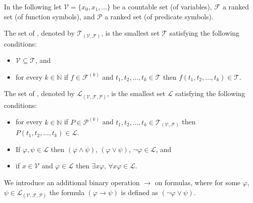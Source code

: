 In the following let $\mathcal{V}=\{x_0,x_1,\dots\}$ be a countable set (of variables), $\mathcal{F}$ a ranked set (of function symbols), and $\mathcal{P}$ a ranked set (of predicate symbols).
\begin{definition}
	The set of , denoted by $\mathcal{T}_{(\mathcal{V},\mathcal{F})}$, is the smallest set $\mathcal{T}$ satisfying the following conditions:
	\begin{itemize}
		\item $\mathcal{V} \subseteq \mathcal{T}$, and
		\item for every $k\in\mathbb{N}$ if $f\in\mathcal{F}^{(k)}$ and $t_1,t_2,\dots,t_k\in\mathcal{T}$ then $f(t_1,t_2,\dots,t_k)\in\mathcal{T}$.
	\end{itemize}
	The set of , denoted by $\mathcal{L}_{(\mathcal{V},\mathcal{F},\mathcal{P})}$, is the smallest set $\mathcal{L}$ satisfying the following conditions:
	\begin{itemize}
		\item for every $k\in\mathbb{N}$ if $P\in\mathcal{P}^{(k)}$ and $t_1,t_2,\dots,t_k\in\mathcal{T}_{(\mathcal{V},\mathcal{F})}$ then $P(t_1,t_2,\dots,t_k)\in\mathcal{L}$.
		\item If $\varphi,\psi\in\mathcal{L}$ then $(\varphi\wedge\psi)$, $(\varphi\vee\psi)$, $\neg \varphi\in\mathcal{L}$, and
		\item if $x\in\mathcal{V}$ and $\varphi\in\mathcal{L}$ then $\exists x\varphi$, $\forall x\varphi\in\mathcal{L}$. %
	\end{itemize}
\end{definition}
We introduce an additional binary operation $\to$ on formulas, where for some $\varphi$, $\psi\in\mathcal{L}_{(\mathcal{V},\mathcal{F},\mathcal{P})}$ the formula $(\varphi\to\psi)$ is defined as $(\neg\varphi\vee\psi)$.

